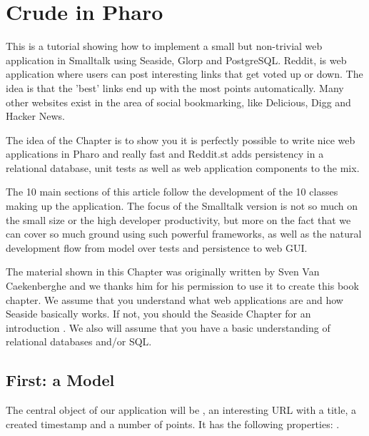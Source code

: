 \documentclass[a4paper,10pt,twoside]{book}
\begin{document}
\fi
\sloppy



\chapter{Crude in Pharo}
\chapterauthor{\authorsven{}}

This is a tutorial showing how to implement a small but non-trivial web application in Smalltalk using Seaside, Glorp and PostgreSQL. Reddit, is web application where users can post interesting links that get voted up or down. The idea is that the 'best' links end up with the most points automatically. Many other websites exist in the area of social bookmarking, like Delicious, Digg and Hacker News.

The idea of the Chapter is to show you it is perfectly possible to write nice web applications in Pharo and really fast and 
Reddit.st adds persistency in a relational database, unit tests as well as web application components to the mix.

The 10 main sections of this article follow the development of the 10 classes making up the application. The focus of the Smalltalk version is not so much on the small size or the high developer productivity, but more on the fact that we can cover so much ground using such powerful frameworks, as well as the natural development flow from model over tests and persistence to web GUI.

The material shown in this Chapter was originally written by Sven Van Caekenberghe and we thanks him for his permission to use it to create this book chapter.  We assume that you understand what web applications are and how Seaside basically works. If not, you should the Seaside Chapter for an introduction . We also will assume that you have a basic understanding of relational databases and/or SQL.


\section{First: a Model}

The central object of our application will be , an interesting URL with a title, a created timestamp and a number of points. It has the following properties: .
\end{document}
